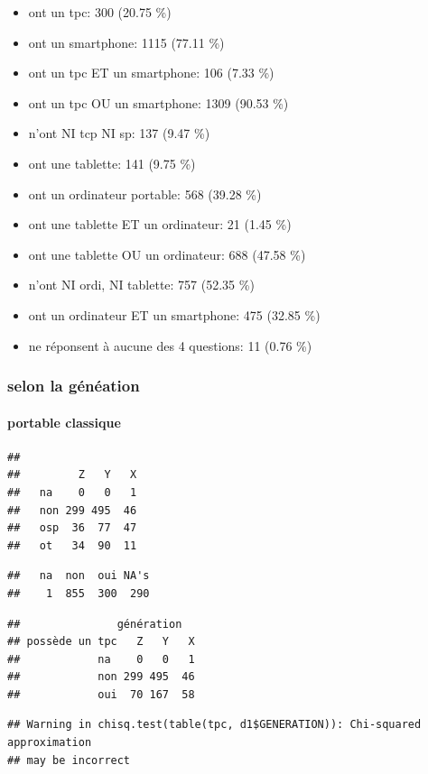 \documentclass[]{article}
\begin{document}
\begin{itemize}
\item
  ont un tpc: 300 (20.75 \%)
\item
  ont un smartphone: 1115 (77.11 \%)
\item
  ont un tpc ET un smartphone: 106 (7.33 \%)
\item
  ont un tpc OU un smartphone: 1309 (90.53 \%)
\item
  n'ont NI tcp NI sp: 137 (9.47 \%)
\item
  ont une tablette: 141 (9.75 \%)
\item
  ont un ordinateur portable: 568 (39.28 \%)
\item
  ont une tablette ET un ordinateur: 21 (1.45 \%)
\item
  ont une tablette OU un ordinateur: 688 (47.58 \%)
\item
  n'ont NI ordi, NI tablette: 757 (52.35 \%)
\item
  ont un ordinateur ET un smartphone: 475 (32.85 \%)
\item
  ne réponsent à aucune des 4 questions: 11 (0.76 \%)
\end{itemize}

\subsubsection{selon la généation}\label{selon-la-geneation}

\paragraph{portable classique}\label{portable-classique}

\begin{verbatim}
##      
##         Z   Y   X
##   na    0   0   1
##   non 299 495  46
##   osp  36  77  47
##   ot   34  90  11
\end{verbatim}

\begin{verbatim}
##   na  non  oui NA's 
##    1  855  300  290
\end{verbatim}

\begin{verbatim}
##               génération
## possède un tpc   Z   Y   X
##            na    0   0   1
##            non 299 495  46
##            oui  70 167  58
\end{verbatim}

\begin{verbatim}
## Warning in chisq.test(table(tpc, d1$GENERATION)): Chi-squared approximation
## may be incorrect
\end{verbatim}
\end{document}
